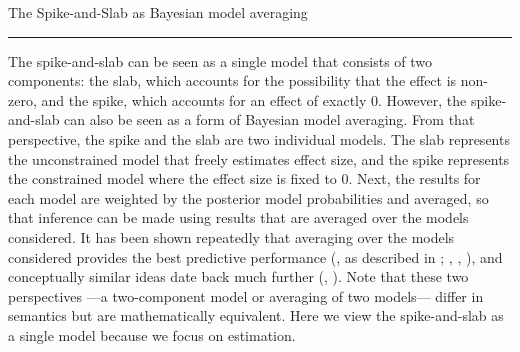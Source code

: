 \documentclass[a4paper]{article}
\begin{document}



\begin{NewBox2}[label=box:box1]{The Spike-and-Slab as Bayesian model averaging}{}   
	\vspace{6pt}\hrule\vspace{6pt}
	The spike-and-slab can be seen as a single model that consists of two components: the slab, which accounts for the possibility that the effect is non-zero, and the spike, which accounts for an effect of exactly 0. 
	However, the spike-and-slab can also be seen as a form of Bayesian model averaging. From that perspective, the spike and the slab are two individual models. The slab represents the unconstrained model that freely estimates effect size, and the spike represents the constrained model where the effect size is fixed to 0. Next, the results for each model are weighted by the posterior model probabilities and averaged, so that inference can be made using results that are averaged over the models considered. It has been shown repeatedly that averaging over the models considered provides the best predictive performance (, as described in ; , , ), and conceptually similar ideas date back much further (, ). Note that these two perspectives ---a two-component model or averaging of two models--- differ in semantics but are mathematically equivalent. Here we view the spike-and-slab as a single model because we focus on estimation.
\end{NewBox2}


\end{document}
